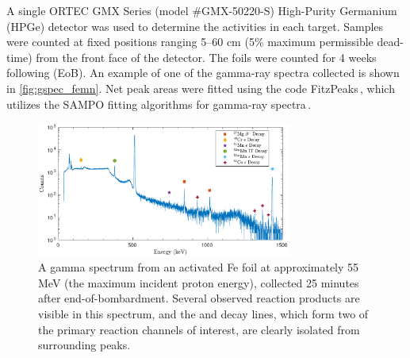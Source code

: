 A single 
ORTEC GMX Series (model \#GMX-50220-S)  High-Purity Germanium (HPGe) detector was used to determine the activities in each target.
Samples were counted at fixed positions ranging 5--60  cm (5\% maximum permissible dead-time) from the front face of the detector.
The foils were counted  for 
4 weeks following 
(EoB).
An example of one of the gamma-ray spectra collected 
is shown in \autoref{fig:gspec_femn}.
Net peak areas were fitted using the 
code FitzPeaks\,\cite{fitzgerald2009fitzpeaks}, which utilizes the SAMPO fitting algorithms for gamma-ray spectra\,\cite{Aarnio2001}.

\begin{figure}
 \centering
 \includegraphics[width=0.75\textwidth]{./figures/sample_gspec_fe.pdf}
 \caption{A gamma spectrum  from an activated Fe foil at approximately 55\,MeV (the maximum incident proton energy), collected 25 minutes after end-of-bombardment. Several observed reaction products are visible in this spectrum, and  the  and  decay lines, which form two of the   primary reaction channels of interest, are  clearly isolated from surrounding peaks. }
 \label{fig:gspec_femn}
\end{figure}

